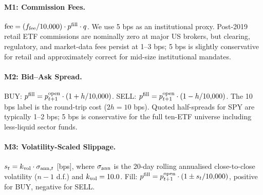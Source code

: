 \documentclass[12pt]{article}
\newcommand{\kfee}{f_{\mathrm{fee}}}
\begin{document}
\paragraph{M1: Commission Fees.}
$\mathrm{fee} = (\kfee / 10{,}000) \cdot p^{\rm fill} \cdot q$.
We use 5 bps as an institutional proxy. Post-2019 retail ETF
commissions are nominally zero at major US brokers, but clearing,
regulatory, and market-data fees persist at 1--3 bps; 5 bps is
slightly conservative for retail and approximately correct for
mid-size institutional mandates.

\paragraph{M2: Bid--Ask Spread.}
BUY: $p^{\rm fill} = p^{\rm open}_{t+1} \cdot (1 + h/10{,}000)$.
SELL: $p^{\rm fill} = p^{\rm open}_{t+1} \cdot (1 - h/10{,}000)$.
The 10 bps label is the round-trip cost ($2h = 10$ bps). Quoted
half-spreads for SPY are typically 1--2 bps; 5 bps is conservative
for the full ten-ETF universe including less-liquid sector funds.

\paragraph{M3: Volatility-Scaled Slippage.}
$s_t = k_{\rm vol} \cdot \sigma_{{\rm ann},t}$ [bps], where
$\sigma_{\rm ann}$ is the 20-day rolling annualised close-to-close
volatility ($n-1$ d.f.) and $k_{\rm vol} = 10.0$. Fill:
$p^{\rm fill} = p^{\rm open}_{t+1} \cdot (1 \pm s_t/10{,}000)$,
positive for BUY, negative for SELL.
\end{document}
